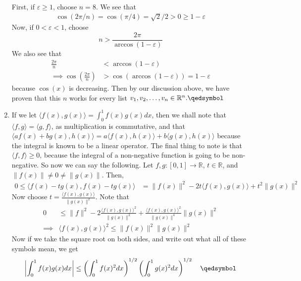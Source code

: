 \documentclass[12pt]{article}
\newcommand{\ipi}[2]{\langle #1, #2 \rangle}
\newcommand{\mgi}[1]{\| #1 \|}
\newcommand{\R}{\mathbb{R}}
\begin{document}
\begin{enumerate}[leftmargin=\labelsep]
	First, if $\varepsilon \geq 1$, choose $n = 8$. We see that
	\begin{align*}
		\cos(2\pi/n) = \cos(\pi/4) = \sqrt{2}/2 > 0 \geq 1-\varepsilon
	\end{align*}
	Now, if $0 < \varepsilon < 1$, choose $$n > \frac{2\pi}{\arccos(1-\varepsilon)}$$ We also see that
	\begin{align*}
		\frac{2\pi}{n} &< \arccos(1-\varepsilon)
		\\\implies \cos\left(\frac{2\pi}{n}\right) &> \cos(\arccos(1-\varepsilon)) = 1-\varepsilon
	\end{align*} because $\cos(x)$ is decreasing. Then by our discussion above, we have proven that this $n$ works for every list $v_1, v_2, \ldots, v_n \in \R^n. \hfill\qedsymbol$
	\item 
		If we let $\ipi{f(x)}{g(x)} = \int_{0}^{1}  f(x)g(x)dx$, then we shall note that $\ipi{f}{g} = \ipi{g}{f}$, as multiplication is commutative, and that $\ipi{af(x)+bg(x)}{h(x)} = a\ipi{f(x)}{h(x)} + b\ipi{g(x)}{h(x)}$ because the integral is known to be a linear operator. The final thing to note is that $\ipi{f}{f} \geq 0$, because the integral of a non-negative function is going to be non-negative. So now we can say the following. Let $f,g:[0,1]\to \R$, $t \in \R$, and $\mgi{f(x)} \neq 0 \neq \mgi{g(x)}$. Then,
		\begin{align*}
			0 \leq \ipi{f(x)-tg(x)}{f(x)-tg(x)} &= \mgi{f(x)}^2 -2t\ipi{f(x)}{g(x)} + t^2\mgi{g(x)}^2
		\end{align*}
		Now choose $t=\frac{\ipi{f(x)}{g(x)}}{\mgi{g(x)}^2}$. Note that 
		\begin{align*}
			0 &\leq \mgi{f}^2-2 \frac{\ipi{f(x)}{g(x)}^2}{\mgi{g(x)}^2}+\frac{\ipi{f(x)}{g(x)}^2}{\mgi{g(x)}^4}\mgi{g(x)}^2 \\ \implies &
			\ipi{f(x)}{g(x)}^2 \leq \mgi{f(x)}^2\mgi{g(x)}^2
		\end{align*} Now if we take the square root on both sides, and write out what all of these symbols mean, we get
	$$\left|\int_{0}^{1} f(x)g(x)dx\right| \leq \left(\int_{0}^{1} f(x)^2dx\right)^{1/2}\left(\int_{0}^{1} g(x)^2dx\right)^{1/2} \quad\qedsymbol$$
	\end{enumerate}
\end{document}
